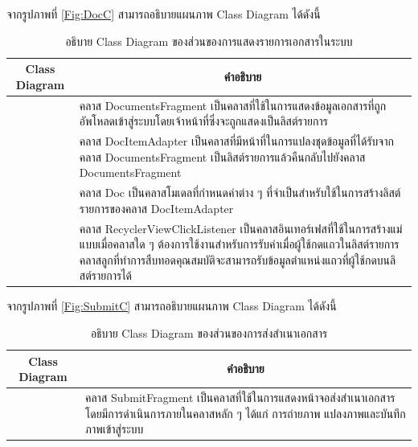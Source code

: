 \newpage
จากรูปภาพที่ \ref{Fig:DocC} สามารถอธิบายแผนภาพ Class Diagram ได้ดังนี้
\begin{table}[H]
	\centering
	\caption{อธิบาย Class Diagram ของส่วนของการแสดงรายการเอกสารในระบบ}
	\label{tab:class}
	\begin{tabular}{|c|p{10cm}|}
		\hline
		\textbf{Class Diagram} & \multicolumn{1}{c|}{\textbf{คำอธิบาย}} \\ \hline
		\raisebox{-\totalheight}{DocumentsFragment}
		& \setstretch{1.5} {คลาส DocumentsFragment เป็นคลาสที่ใช้ในการแสดงข้อมูลเอกสารที่ถูกอัพโหลดเข้าสู่ระบบโดยเจ้าหน้าที่ซึ่งจะถูกแสดงเป็นลิสต์รายการ} \\ \hline
		\raisebox{-\totalheight}{DocItemAdapter}
		& \setstretch{1.5} {คลาส DocItemAdapter เป็นคลาสที่มีหน้าที่ในการแปลงชุดข้อมูลที่ได้รับจากคลาส DocumentsFragment เป็นลิสต์รายการแล้วคืนกลับไปยังคลาส DocumentsFragment} \\ \hline
		\raisebox{-\totalheight}{Doc}
		& \setstretch{1.5} {คลาส Doc เป็นคลาสโมเดลที่กำหนดค่าต่าง ๆ ที่จำเป็นสำหรับใช้ในการสร้างลิสต์รายการของคลาส DocItemAdapter} \\ \hline
		\raisebox{-\totalheight}{RecyclerViewClickListener}
		& \setstretch{1.5} {คลาส RecyclerViewClickListener เป็นคลาสอินเทอร์เฟสที่ใช้ในการสร้างแม่แบบเมื่อคลาสใด ๆ ต้องการใช้งานสำหรับการรับค่าเมื่อผู้ใช้กดแถวในลิสต์รายการ คลาสลูกที่ทำการสืบทอดคุณสมบัติจะสามารถรับข้อมูลตำแหน่งแถวที่ผู้ใช้กดบนลิสต์รายการได้} \\ \hline
	\end{tabular}
\end{table}

\newpage
จากรูปภาพที่ \ref{Fig:SubmitC} สามารถอธิบายแผนภาพ Class Diagram ได้ดังนี้
\begin{table}[H]
	\centering
	\caption{อธิบาย Class Diagram ของส่วนของการส่งสำเนาเอกสาร}
	\label{tab:class}
	\begin{tabular}{|c|p{10cm}|}
		\hline
		\textbf{Class Diagram} & \multicolumn{1}{c|}{\textbf{คำอธิบาย}} \\ \hline
		\raisebox{-\totalheight}{SubmitFragment}
		& \setstretch{1.5} {คลาส SubmitFragment เป็นคลาสที่ใช้ในการแสดงหน้าจอส่งสำเนาเอกสาร โดยมีการดำเนินการภายในคลาสหลัก ๆ ได้แก่ การถ่ายภาพ แปลงภาพและบันทึกภาพเข้าสู่ระบบ} \\ \hline
	\end{tabular}
\end{table}

